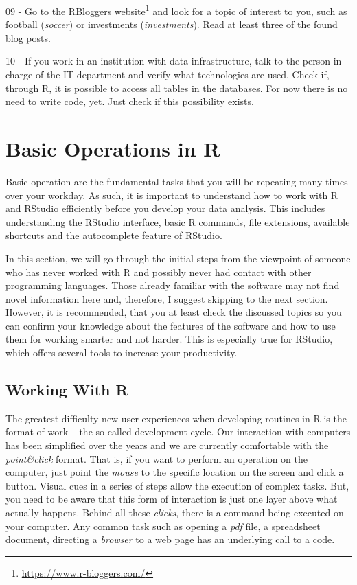 \documentclass[
  12pt,
]{book}
\begin{document}
09 -
Go to the \href{https://www.r-bloggers.com/}{RBloggers website}\footnote{\url{https://www.r-bloggers.com/}} and look for a topic of interest to you, such as football (\emph{soccer}) or investments (\emph{investments}). Read at least three of the found blog posts.

10 -
If you work in an institution with data infrastructure, talk to the person in charge of the IT department and verify what technologies are used. Check if, through R, it is possible to access all tables in the databases. For now there is no need to write code, yet. Just check if this possibility exists.

\hypertarget{basicoperations}{%
\chapter{Basic Operations in R}\label{basicoperations}}

Basic operation are the fundamental tasks that you will be repeating many times over your workday. As such, it is important to understand how to work with R and RStudio efficiently before you develop your data analysis. This includes understanding the RStudio interface, basic R commands, file extensions, available shortcuts and the autocomplete feature of RStudio.

In this section, we will go through the initial steps from the viewpoint of someone who has never worked with R and possibly never had contact with other programming languages. Those already familiar with the software may not find novel information here and, therefore, I suggest skipping to the next section. However, it is recommended, that you at least check the discussed topics so you can confirm your knowledge about the features of the software and how to use them for working smarter and not harder. This is especially true for RStudio, which offers several tools to increase your productivity.

\hypertarget{working-with-r}{%
\section{Working With R}\label{working-with-r}}

The greatest difficulty new user experiences when developing routines in R is the format of work -- the so-called development cycle. Our interaction with computers has been simplified over the years and we are currently comfortable with the \emph{point\&click} format. That is, if you want to perform an operation on the computer, just point the \emph{mouse} to the specific location on the screen and click a button. Visual cues in a series of steps allow the execution of complex tasks. But, you need to be aware that this form of interaction is just one layer above what actually happens. Behind all these \emph{clicks}, there is a command being executed on your computer. Any common task such as opening a \emph{pdf} file, a spreadsheet document, directing a \emph{browser} to a web page has an underlying call to a code.
\end{document}

